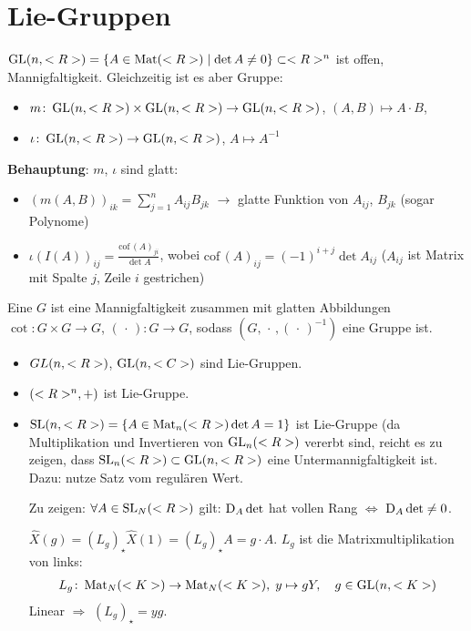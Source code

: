\section{Lie-Gruppen}
$\operatorname{GL}(n,<R>) = \{A\in \operatorname{Mat}(<R>)\mid \det A\neq 0\}\subset<R>^n$ ist offen, Mannigfaltigkeit. Gleichzeitig ist es aber Gruppe:\begin{itemize}
	\item $m\colon \operatorname{GL}(n,<R>)\times\operatorname{GL}(n,<R>)\to\operatorname{GL}(n,<R>)$, $(A,B)\mapsto A\cdot B$,
	\item $\iota\colon \operatorname{GL}(n,<R>)\to\operatorname{GL}(n,<R>)$, $A\mapsto A^{-1}$
\end{itemize}

\textbf{Behauptung}: $m$, $\iota$ sind glatt:\begin{itemize}
	\item $(m(A,B))_{ik} = \sum_{j=1}^n A_{ij}B_{jk}$ $\rightarrow$ glatte Funktion von $A_{ij}$, $B_{jk}$ (sogar Polynome)
	\item $\displaystyle \iota(I(A))_{ij} = \frac{\mathrm{cof}\,(A)_{ji}}{\det A}$, wobei $\mathrm{cof}\,(A)_{ij} = (-1)^{i+j}\det A_{ij}$ ($A_{ij}$ ist Matrix mit Spalte $j$, Zeile $i$ gestrichen)
\end{itemize}

\begin{definition}
	Eine  $G$ ist eine Mannigfaltigkeit zusammen mit glatten Abbildungen $\cot\colon G\times G\to G$, $(\,\cdot\,)\colon G\to G$, sodass $(G,\,\cdot\,,(\,\cdot\,)^{-1})$ eine Gruppe ist.
\end{definition}

\begin{example}
	\begin{itemize}
		\item $GL(n,<R>)$, $\operatorname{GL}(n,<C>)$ sind Lie-Gruppen.
		\item $(<R>^n,+)$ ist Lie-Gruppe.
		\item $\operatorname{SL}(n,<R>) = \{A\in\operatorname{Mat}_n(<R>)\det A=1\}$ ist Lie-Gruppe (da Multiplikation und Invertieren von $\operatorname{GL}_n(<R>)$ vererbt sind, reicht es zu zeigen, dass $\operatorname{SL}_n(<R>)\subset\operatorname{GL}(n,<R>)$ eine Untermannigfaltigkeit ist. Dazu: nutze Satz vom regulären Wert.
		
		Zu zeigen: $\forall A\in\operatorname{SL}_N(<R>)$ gilt: $\operatorname{D}_A \det$ hat vollen Rang $\Leftrightarrow$ $\operatorname{D}_A \det \neq 0$.
		
		$\hat X(g) = (L_g)_\star \hat X(1) = (L_g)_\star A = g\cdot A$. $L_g$ ist die Matrixmultiplikation von links: \begin{align*}
			L_g\colon \operatorname{Mat}_N(<K>)\to \operatorname{Mat}_N(<K>),\;y\mapsto g Y, \quad g\in\operatorname{GL}(n,<K>)
		\end{align*}
		Linear $\Rightarrow$ $(L_g)_\star = yg.$
	\end{itemize}
\end{example}

